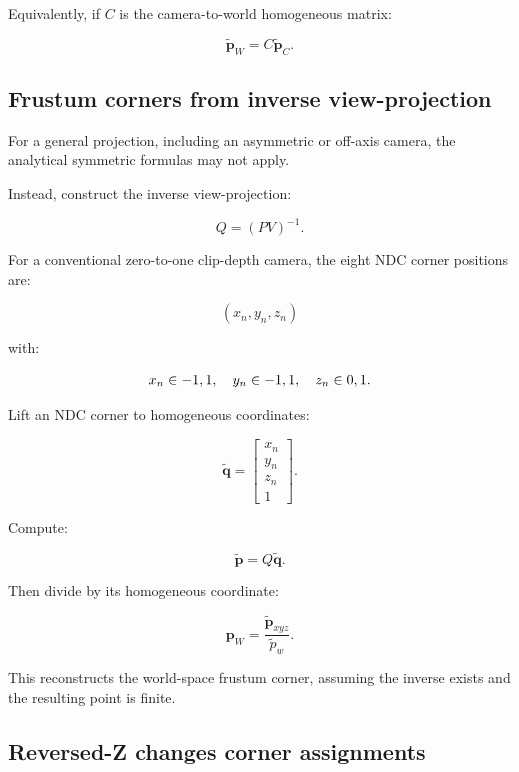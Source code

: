 Equivalently, if \(C\) is the camera-to-world homogeneous matrix:

\[
 \boxed{ \tilde{\mathbf p}_W=C\tilde{\mathbf p}_C }.
\]

\subsection{Frustum corners from inverse view-projection}\label{02-foundations-ii-ch034-frustum-corners-from-inverse-view-projection}

\hypertarget{02-foundations-ii-ch034-frustum-corners-from-inverse-view-projection}{}

For a general projection, including an asymmetric or off-axis camera, the analytical symmetric formulas may not apply.

Instead, construct the inverse view-projection:

\[
 \boxed{ Q=(PV)^{-1} }.
\]

For a conventional zero-to-one clip-depth camera, the eight NDC corner positions are:

\[
 (x_n,y_n,z_n)
\]

with:

\[
 x_n\in\\{-1,1\\},\quad y_n\in\\{-1,1\\},\quad z_n\in\\{0,1\\}.
\]

Lift an NDC corner to homogeneous coordinates:

\[
 \tilde{\mathbf q}= \begin{bmatrix}x_n\\y_n\\z_n\\1\end{bmatrix}.
\]

Compute:

\[
 \tilde{\mathbf p}=Q\tilde{\mathbf q}.
\]

Then divide by its homogeneous coordinate:

\[
 \boxed{ \mathbf p_W= \frac{\tilde{\mathbf p}_{xyz}}{\tilde p_w} }.
\]

This reconstructs the world-space frustum corner, assuming the inverse exists and the resulting point is finite.

\subsection{Reversed-Z changes corner assignments}\label{02-foundations-ii-ch034-reversed-z-changes-corner-assignments}

